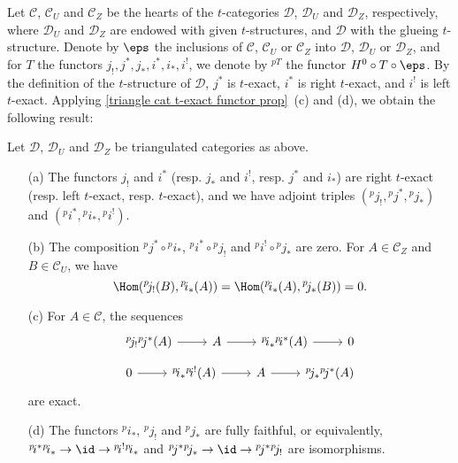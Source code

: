 Let $\mathcal{C}$, $\mathcal{C}_U$ and $\mathcal{C}_Z$ be the hearts of the $t$-categories $\mathcal{D}$, $\mathcal{D}_U$ and $\mathcal{D}_Z$, respectively, where $\mathcal{D}_U$ and $\mathcal{D}_Z$ are endowed with given $t$-structures, and $\mathcal{D}$ with the glueing $t$-structure. Denote by $\eps$ the inclusions of $\mathcal{C}$, $\mathcal{C}_U$ or $\mathcal{C}_Z$ into $\mathcal{D}$, $\mathcal{D}_U$ or $\mathcal{D}_Z$, and for $T$ the functors $j_!,j^*,j_*,i^*,i_*,i^!$, we denote by $^{pT}$ the functor $H^0\circ T\circ\eps$. By the definition of the $t$-structure of $\mathcal{D}$, $j^*$ is $t$-exact, $i^*$ is right $t$-exact, and $i^!$ is left $t$-exact. Applying \cref{triangle cat t-exact functor prop}~(c) and (d), we obtain the following result:
\begin{proposition}\label{triangle cat recollement functors composition and exact sequence}
Let $\mathcal{D}$, $\mathcal{D}_U$ and $\mathcal{D}_Z$ be triangulated categories as above.
\begin{enumerate}
    \item[(a)] The functors $j_!$ and $i^*$ (resp. $j_*$ and $i^!$, resp. $j^*$ and $i_*$) are right $t$-exact (resp. left $t$-exact, resp. $t$-exact), and we have adjoint triples $({^p\!j_!},{^p\!j^*},{^p\!j_*})$ and $({^p\!i^*},{^p\!i_*},{^p\!i^!})$.
    \item[(b)] The composition ${^p\!j^*}\circ{^p\!i_*}$, ${^p\!i^*}\circ{^p\!j_!}$ and ${^p\!i^!}\circ{^p\!j_*}$ are zero. For $A\in\mathcal{C}_Z$ and $B\in\mathcal{C}_U$, we have
\[\Hom({^p\!j_!}(B),{^p\!i_*}(A))=\Hom({^p\!i_*}(A),{^p\!j_*}(B))=0.\]
    \item[(c)] For $A\in\mathcal{C}$, the sequences
    \[\begin{tikzcd}
        {^p\!j_!}{^p\!j^*}(A)\ar[r]&A\ar[r]&{^p\!i_*}{^p\!i^*}(A)\ar[r]&0
    \end{tikzcd}\]
    \vspace*{-4mm}
    \[\begin{tikzcd}
        0\ar[r]&{^p\!i_*}{^p\!i^!}(A)\ar[r]&A\ar[r]&{^p\!j_*}{^p\!j^*}(A)
    \end{tikzcd}\]
    are exact.
    \item[(d)] The functors ${^p\!i_*}$, ${^p\!j_!}$ and ${^p\!j_*}$ are fully faithful, or equivalently, ${^p\!i^*}{^p\!i_*}\to\id\to{^p\!i^!}{^p\!i_*}$ and ${^p\!j^*}{^p\!j_*}\to\id\to{^p\!j^*}{^p\!j_!}$ are isomorphisms. 
\end{enumerate}
\end{proposition}
